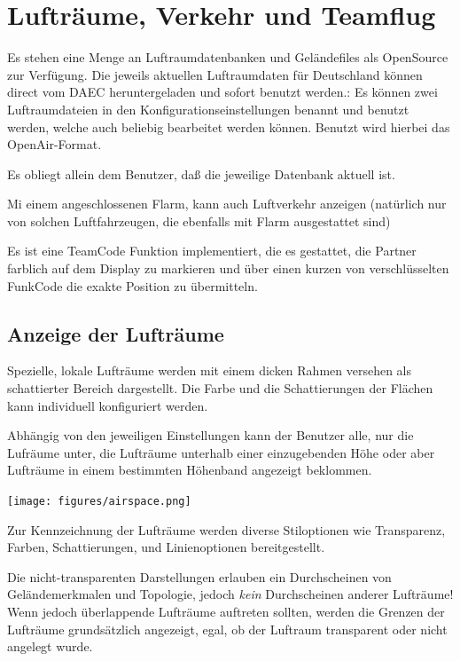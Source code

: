 \chapter{Lufträume, Verkehr und Teamflug}\label{cha:airspace}

Es stehen eine Menge an Luftraumdatenbanken und Geländefiles als OpenSource zur Verfügung. Die
jeweils aktuellen Luftraumdaten für Deutschland können direct vom DAEC heruntergeladen und sofort
benutzt werden.: 
Es können zwei Luftraumdateien in den Konfigurationseinstellungen benannt und benutzt werden,
welche auch beliebig bearbeitet werden können. Benutzt wird hierbei das \textsf{OpenAir}-Format.

\blink{}\blink{}

Es obliegt allein dem Benutzer, daß die jeweilige Datenbank aktuell ist.

Mi einem angeschlossenen Flarm, kann \xc  auch Luftverkehr anzeigen (natürlich nur von solchen
Luftfahrzeugen, die ebenfalls mit Flarm ausgestattet sind)

Es ist eine TeamCode Funktion implementiert, die es gestattet, die Partner farblich auf dem Display zu
markieren und über einen kurzen von \xc verschlüsselten FunkCode die exakte Position zu übermitteln.


\section{Anzeige der Lufträume}

Spezielle, lokale Lufträume werden mit einem dicken Rahmen versehen
als schattierter Bereich dargestellt. Die Farbe und die Schattierungen der
Flächen kann individuell konfiguriert werden.

Abhängig von den jeweiligen Einstellungen kann der Benutzer alle,
nur die Lufräume unter, die Lufträume unterhalb einer einzugebenden Höhe oder
aber Lufträume in einem bestimmten Höhenband angezeigt beklommen.


\begin{center}
\texttt{[image: figures/airspace.png]}
\end{center}

Zur Kennzeichnung der Lufträume werden diverse Stiloptionen wie Transparenz, Farben,
Schattierungen, und Linienoptionen bereitgestellt.

Die nicht-transparenten  Darstellungen erlauben ein Durchscheinen von
Geländemerkmalen und Topologie, jedoch \emph{kein} Durchscheinen anderer Lufträume!
Wenn jedoch überlappende Lufträume auftreten sollten, werden die Grenzen der
Lufträume grundsätzlich angezeigt, egal, ob der Luftraum transparent oder nicht angelegt wurde.

